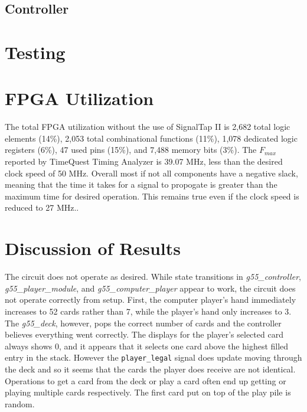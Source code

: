 \documentclass[12pt]{article}
\begin{document}
\subsection{Controller}

\section{Testing}

\section{FPGA Utilization}
The total FPGA utilization without the use of SignalTap II is 2,682 total logic elements (14\%), 2,053 total combinational functions (11\%), 1,078 dedicated logic registers (6\%), 47 used pins (15\%), and 7,488 memory bits (3\%). The $F_{max}$ reported by TimeQuest Timing Analyzer is 39.07 MHz, less than the desired clock speed of 50 MHz. Overall most if not all components have a negative slack, meaning that the time it takes for a signal to propogate is greater than the maximum time for desired operation. This remains true even if the clock speed is reduced to 27 MHz..

\section{Discussion of Results}
The circuit does not operate as desired. While state transitions in \textit{g55\_controller}, \textit{g55\_player\_module}, and \textit{g55\_computer\_player} appear to work, the circuit does not operate correctly from setup. First, the computer player's hand immediately increases to 52 cards rather than 7, while the player's hand only increases to 3. The \textit{g55\_deck}, however, pops the correct number of cards and the controller believes everything went correctly. The displays for the player's selected card always shows 0, and it appears that it selects one card above the highest filled entry in the stack. However the \texttt{player\_legal} signal does update moving through the deck and so it seems that the cards the player does receive are not identical. Operations to get a card from the deck or play a card often end up getting or playing multiple cards respectively. The first card put on top of the play pile is random. \\
\end{document}
